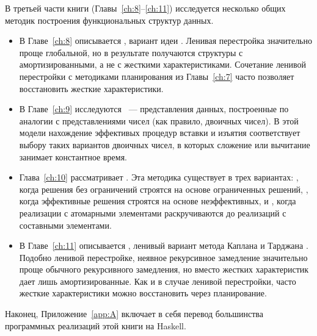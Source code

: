 В третьей части книги (Главы~\ref{ch:8}--\ref{ch:11}) исследуется
несколько общих методик построения функциональных структур данных.
\begin{itemize}
\item В Главе~\ref{ch:8} описывается , вариант идеи  \cite{Overmars1983}.  Ленивая перестройка значительно
  проще глобальной, но в результате получаются структуры с
  амортизированными, а не с жесткими характеристиками.  Сочетание
  ленивой перестройки с методиками планирования из Главы~\ref{ch:7}
  часто позволяет восстановить жесткие характеристики.
\item В Главе~\ref{ch:9} исследуются ~--- представления
  данных, построенные по аналогии с представлениями чисел (как
  правило, двоичных чисел). В этой модели нахождение эффективых
  процедур вставки и изъятия соответствует выбору таких вариантов
  двоичных чисел, в которых сложение или вычитание занимает
  константное время.
\item Глава~\ref{ch:10} рассматривает  \cite{Buchsbaum1993}. Эта
  методика существует в трех вариантах: , когда решения без
  ограничений строятся на основе ограниченных решений,
  , когда
  эффективные решения строятся на основе неэффективных, и
  , когда реализации с атомарными элементами раскручиваются до
  реализаций с составными элементами.
\item В Главе~\ref{ch:11} описывается , ленивый вариант метода
   Каплана и
  Тарджана \cite{KaplanTarjan1995}.  Подобно ленивой перестройке,
  неявное рекурсивное замедление значительно проще обычного
  рекурсивного замедления, но вместо жестких характеристик дает лишь
  амортизированные. Как и в случае ленивой перестройки, часто жесткие
  характеристики можно восстановить через планирование.
\end{itemize}

Наконец, Приложение~\ref{app:A} включает в себя перевод большинства
программных реализаций этой книги на Haskell.

